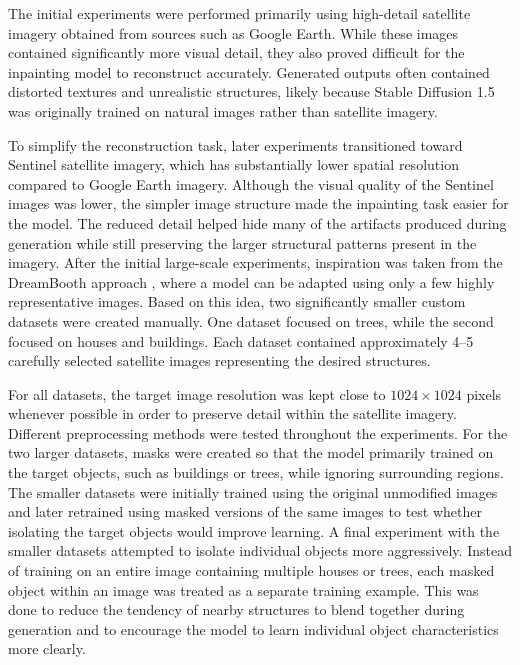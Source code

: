 \documentclass{article}
\begin{document}
The initial experiments were performed primarily using high-detail satellite imagery obtained from sources such as Google Earth. While these images contained significantly more visual detail, they also proved difficult for the inpainting model to reconstruct accurately. Generated outputs often contained distorted textures and unrealistic structures, likely because Stable Diffusion 1.5 was originally trained on natural images rather than satellite imagery.
\newline

To simplify the reconstruction task, later experiments transitioned toward Sentinel satellite imagery, which has substantially lower spatial resolution compared to Google Earth imagery. Although the visual quality of the Sentinel images was lower, the simpler image structure made the inpainting task easier for the model. The reduced detail helped hide many of the artifacts produced during generation while still preserving the larger structural patterns present in the imagery.
After the initial large-scale experiments, inspiration was taken from the DreamBooth approach \citep{dreambooth}, where a model can be adapted using only a few highly representative images. Based on this idea, two significantly smaller custom datasets were created manually. One dataset focused on trees, while the second focused on houses and buildings. Each dataset contained approximately 4--5 carefully selected satellite images representing the desired structures.
\newline

For all datasets, the target image resolution was kept close to $1024 \times 1024$ pixels whenever possible in order to preserve detail within the satellite imagery.
Different preprocessing methods were tested throughout the experiments. For the two larger datasets, masks were created so that the model primarily trained on the target objects, such as buildings or trees, while ignoring surrounding regions. The smaller datasets were initially trained using the original unmodified images and later retrained using masked versions of the same images to test whether isolating the target objects would improve learning.
\newline
A final experiment with the smaller datasets attempted to isolate individual objects more aggressively. Instead of training on an entire image containing multiple houses or trees, each masked object within an image was treated as a separate training example. This was done to reduce the tendency of nearby structures to blend together during generation and to encourage the model to learn individual object characteristics more clearly.
\end{document}
